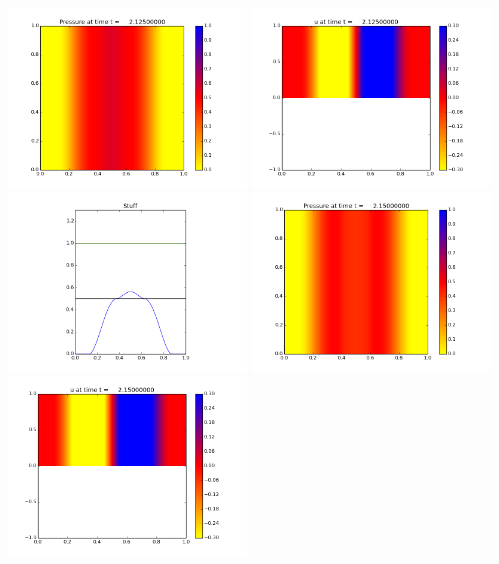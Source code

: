 \documentclass[11pt]{article}
\begin{document}
\vskip 10pt 
\includegraphics[width=0.475\textwidth]{frame0085fig0.png}
\includegraphics[width=0.475\textwidth]{frame0085fig1.png}
\vskip 10pt 
\includegraphics[width=0.475\textwidth]{frame0085fig3.png}
\vskip 10pt 
\includegraphics[width=0.475\textwidth]{frame0086fig0.png}
\includegraphics[width=0.475\textwidth]{frame0086fig1.png}
\end{document}
